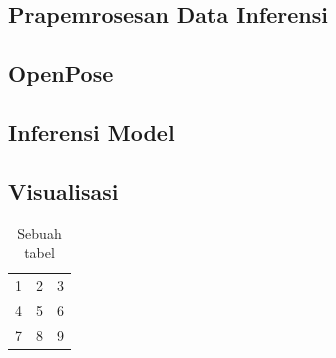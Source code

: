 \subsection{Prapemrosesan Data Inferensi}

\subsection{OpenPose}

\subsection{Inferensi Model}

\subsection{Visualisasi}

\begin{table}[htbp]
    \captionsetup{labelfont=bf, textfont=bf}
    \caption{Sebuah tabel}
    \vspace{-20pt}
    \begin{center}
        \begin{tabular}{| l c r |}
            \hline
            1 & 2 & 3 \\
            4 & 5 & 6 \\
            7 & 8 & 9 \\
            \hline
        \end{tabular}
    \end{center}
    \vspace{-10pt}
    \captionsetup{labelfont=md, textfont=md}
\end{table}